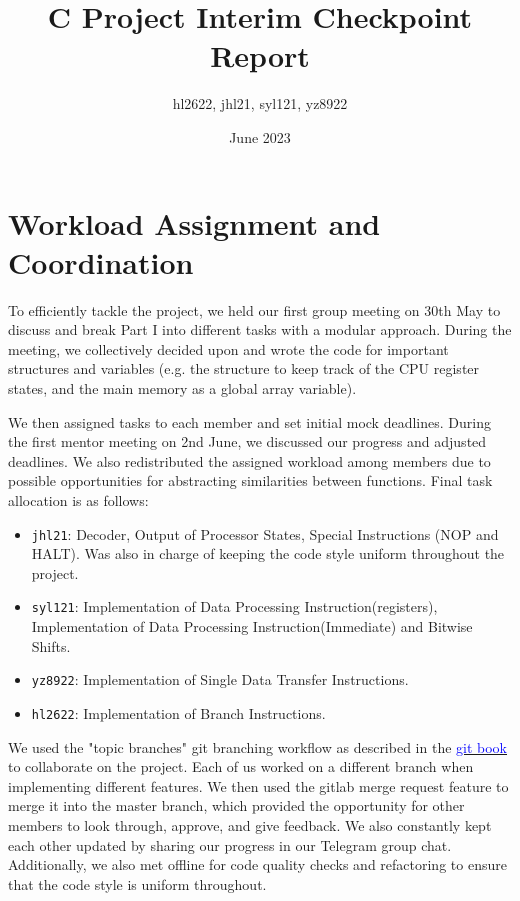 \documentclass{article}
\title{C Project Interim Checkpoint Report}
\author{hl2622, jhl21, syl121, yz8922}
\date{June 2023}
\newcommand{\blue}[1]{\textcolor{blue}{#1}}
\begin{document}
    \maketitle
    \section{Workload Assignment and Coordination}
    To efficiently tackle the project, we held our first group meeting on 30th May to discuss and break Part I into different tasks with a modular approach. During the meeting, we collectively decided upon and wrote the code for important structures and variables %
    (e.g. the structure to keep track of the CPU register states, and the main memory as a global array variable). 
    
    We then assigned tasks to each member and set initial mock deadlines. During the first mentor meeting on 2nd June, we discussed our progress and adjusted deadlines. %
    We also redistributed the assigned workload among members %
    due to possible opportunities for abstracting similarities between functions. Final task allocation is as follows: 
    \begin{itemize}
        \item \texttt{jhl21}: Decoder, Output of Processor States,  Special Instructions (NOP and HALT). Was also in charge of keeping the code style uniform throughout the project.
        \item \texttt{syl121}: Implementation of Data Processing Instruction(registers), Implementation of Data Processing Instruction(Immediate) and Bitwise Shifts.
        \item \texttt{yz8922}: Implementation of Single Data Transfer Instructions.
        \item \texttt{hl2622}: Implementation of Branch Instructions.
    \end{itemize}
    We used the "topic branches" git branching workflow as described in the \href{https://git-scm.com/book/en/v2/Git-Branching-Branching-Workflows}{\blue{git book}} to collaborate on the project. Each of us worked on a different branch when implementing different features. We then used the gitlab merge request feature to merge it into the master branch, which provided the opportunity for other members to look through, approve, and give feedback. We also constantly kept each other updated by sharing our progress in our Telegram group chat. Additionally, we also met offline for code quality checks and refactoring to ensure that the code style is uniform throughout.
    
\end{document}

